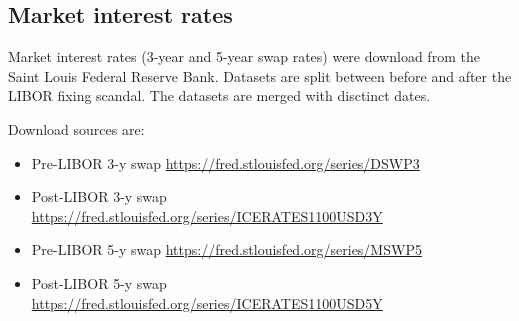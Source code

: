 \documentclass[11pt,]{report}
\newenvironment{Shaded}{\begin{snugshade}}{\end{snugshade}}
\newcommand{\CommentTok}[1]{\textcolor[rgb]{0.56,0.35,0.01}{\textit{#1}}}
\newcommand{\DataTypeTok}[1]{\textcolor[rgb]{0.13,0.29,0.53}{#1}}
\newcommand{\DecValTok}[1]{\textcolor[rgb]{0.00,0.00,0.81}{#1}}
\newcommand{\KeywordTok}[1]{\textcolor[rgb]{0.13,0.29,0.53}{\textbf{#1}}}
\newcommand{\NormalTok}[1]{#1}
\newcommand{\OperatorTok}[1]{\textcolor[rgb]{0.81,0.36,0.00}{\textbf{#1}}}
\newcommand{\StringTok}[1]{\textcolor[rgb]{0.31,0.60,0.02}{#1}}
\begin{document}
\small

\begin{Shaded}
\end{Shaded}

\normalsize

\hypertarget{market-interest-rates}{%
\subsection{Market interest rates}\label{market-interest-rates}}

Market interest rates (3-year and 5-year swap rates) were download from the Saint Louis Federal Reserve Bank. Datasets are split between before and after the LIBOR fixing scandal. The datasets are merged with disctinct dates.

Download sources are:

\begin{itemize}
\item
  Pre-LIBOR 3-y swap \url{https://fred.stlouisfed.org/series/DSWP3}
\item
  Post-LIBOR 3-y swap \url{https://fred.stlouisfed.org/series/ICERATES1100USD3Y}
\item
  Pre-LIBOR 5-y swap \url{https://fred.stlouisfed.org/series/MSWP5}
\item
  Post-LIBOR 5-y swap \url{https://fred.stlouisfed.org/series/ICERATES1100USD5Y}
\end{itemize}

\small
\end{document}
